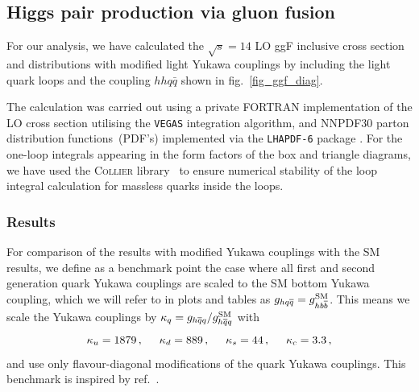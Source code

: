 \subsection{Higgs pair production via gluon fusion \label{sec:ggFly}}

For our analysis, we have calculated the $ \sqrt{s} = 14$   LO ggF inclusive cross section and distributions with modified light Yukawa couplings by including the light quark loops and the coupling $hh q \bar q$ shown in fig.~\ref{fig_ggf_diag}.

The calculation was carried out using a private FORTRAN implementation of the LO cross section utilising the \texttt{VEGAS} integration algorithm, and NNPDF30 parton distribution functions~(PDF's)\cite{Ball:2017nwa} implemented via the \texttt{LHAPDF-6} package \cite{Buckley:2014ana}. For the one-loop integrals appearing in the form factors of the box and triangle diagrams, we have used the \textsc{Collier} library~\cite{Denner:2014gla} to ensure numerical stability of the loop integral calculation for massless quarks inside the loops.

\subsubsection{Results}
For comparison of the results with modified Yukawa couplings with the SM results, we define as a benchmark point the case where all first and second generation quark Yukawa couplings are scaled to the SM bottom Yukawa coupling, which we will refer to in plots and tables as $g_{hq \overline q} = g_{h b \overline b}^{\mathrm{SM}}$. This means we scale the Yukawa couplings by $\kappa_q=g_{h\overline{q}q}/g_{h\overline q q}^{\mathrm{SM}}$ with
\begin{equation}
	\kappa_u=  1879\,, \hspace*{0.5cm} \kappa_d= 889 \,, \hspace*{0.5cm}\kappa_s= 44\,, \hspace*{0.5cm} \kappa_c =3.3\,, \label{eq:fitbounds}
\end{equation}
and use only flavour-diagonal modifications of the quark Yukawa couplings.
This benchmark is inspired by ref.~\cite{Bar-Shalom:2018rjs}.

